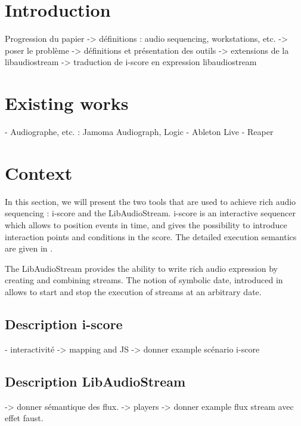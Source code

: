 \documentclass{article}
\title{\papertitle}
\begin{document}
%
\capstartfalse
\maketitle
\capstarttrue
%
\begin{abstract}
Place your abstract at the top left column on the first page.
Please write about 150--200 words that specifically highlight the purpose of your work,
its context, and provide a brief synopsis of your results.
Avoid equations in this part.
\end{abstract}

\section{Introduction}

Progression du papier
-> définitions : audio sequencing, workstations, etc.
-> poser le problème
-> définitions et présentation des outils
-> extensions de la libaudiostream
-> traduction de i-score en expression libaudiostream


\section{Existing works}
- Audiographe, etc. : Jamoma Audiograph, Logic
- Ableton Live
- Reaper

\section{Context}
In this section, we will present the two tools that are used to achieve 
rich audio sequencing : i-score and the LibAudioStream.
i-score is an interactive sequencer which allows to position events 
in time, and gives the possibility to introduce interaction points and 
conditions in the score.
The detailed execution semantics are given in \cite{celerier2015ossia}.

The LibAudioStream provides the ability to write rich audio expression
by creating and combining streams. The notion of symbolic date, introduced in 
allows to start and stop the execution of streams at an arbitrary date.

\subsection{Description i-score}
- interactivité
-> mapping and JS
-> donner example scénario i-score


\subsection{Description LibAudioStream}
-> donner sémantique des flux.
-> players
-> donner example flux stream avec effet faust.
\end{document}
